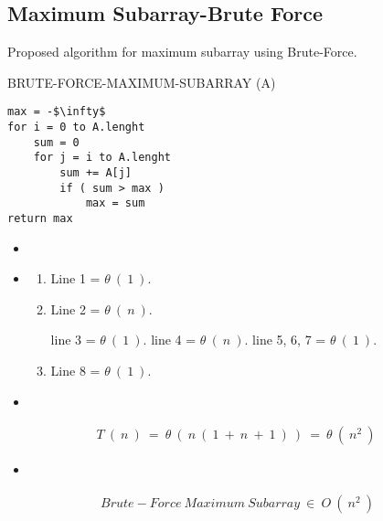 \subsection{Maximum Subarray-Brute Force}

Proposed algorithm for maximum subarray using Brute-Force. \hfill \break

{\bfseries\color{Violet}{function}}  BRUTE-FORCE-MAXIMUM-SUBARRAY (A)
\begin{lstlisting}[mathescape=true]
max = -$\infty$
for i = 0 to A.lenght
	sum = 0
	for j = i to A.lenght
		sum += A[j]
		if ( sum > max )
			max = sum 
return max
\end{lstlisting} \hfill

\begin{itemize}
\item {\bfseries\itshape\color{carmine}{Demonstration:}} 
\end{itemize} 

\begin{itemize}
\item {\bfseries\itshape\color{Violet}{Analyzing the complexity of each line:}}
\begin{enumerate}
\item Line 1 = $\theta\ (\ 1\ )$.
\item Line 2 = $\theta\ (\ n\ )$.
\begin{tasks}
\task line 3 = $\theta\ (\ 1\ )$.
\task line 4 = $\theta\ (\ n\ )$.
\task line 5, 6, 7 = $\theta\ (\ 1\ )$.
\end{tasks}
\item Line 8 = $\theta\ (\ 1\ )$.  
\end{enumerate}
\end{itemize} \hfill

\begin{itemize}
\item {\bfseries\itshape\color{Violet}{Then, from all lines we can conclude:}}
\end{itemize} \hfill

\begin{ceqn}
\begin{align}
T\ (\ n\ )\ =\ \theta\ (\ n\ (\ 1\ +\ n\ +\ 1\ )\ )\ =\ \theta\ (\ n^{2}\ )\
\end{align}
\end{ceqn} \hfill

\begin{itemize}
\item {\bfseries\itshape\color{Violet}{Finally:}}
\end{itemize} \hfill

\begin{ceqn}
\begin{align}
 Brute-Force\ Maximum\ Subarray\  \in\ O\ (\ n^{2}\ )
\end{align}
\end{ceqn}

\pagebreak